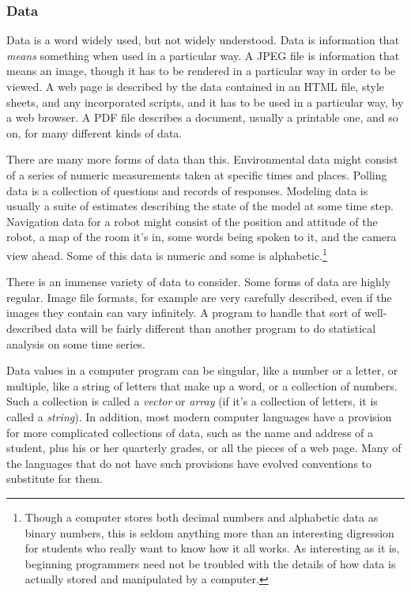 \documentclass[11pt]{article}
\begin{document}
\subsubsection{Data}

Data is a word widely used, but not widely understood.  Data is
information that \emph{means} something when used in a particular way.
A JPEG file is information that means an image, though it has to be
rendered in a particular way in order to be viewed.  A web page is
described by the data contained in an HTML file, style sheets, and
any incorporated scripts, and it has to be used in a particular way,
by a web browser.  A PDF file describes a document, usually a
printable one, and so on, for many different kinds of data.

There are many more forms of data than this.  Environmental data might
consist of a series of numeric measurements taken at specific times
and places.  Polling data is a collection of questions and records of
responses.  Modeling data is usually a suite of estimates describing
the state of the model at some time step.  Navigation data for a robot
might consist of the position and attitude of the robot, a map of the
room it's in, some words being spoken to it, and the camera view
ahead.  Some of this data is numeric and some is
alphabetic.\footnote{Though a computer stores both decimal numbers and
  alphabetic data as binary numbers, this is seldom anything more than
  an interesting digression for students who really want to know how
  it all works.  As interesting as it is, beginning programmers need
  not be troubled with the details of how data is actually stored and
  manipulated by a computer.}

There is an immense variety of data to consider.  Some forms of data
are highly regular.  Image file formats, for example are very
carefully described, even if the images they contain can vary
infinitely.  A program to handle that sort of well-described data will
be fairly different than another program to do statistical analysis on
some time series.

Data values in a computer program can be singular, like a
number or a letter, or multiple, like a string of letters that make up
a word, or a collection of numbers.  Such a collection is called a
\emph{vector} or \emph{array} (if it's a collection of letters, it is
called a \emph{string}).  In addition, most modern computer
languages have a provision for more complicated collections of data,
such as the name and address of a student, plus his or her quarterly
grades, or all the pieces of a web page.  Many of the languages that
do not have such provisions have evolved conventions to substitute for
them.
\end{document}

